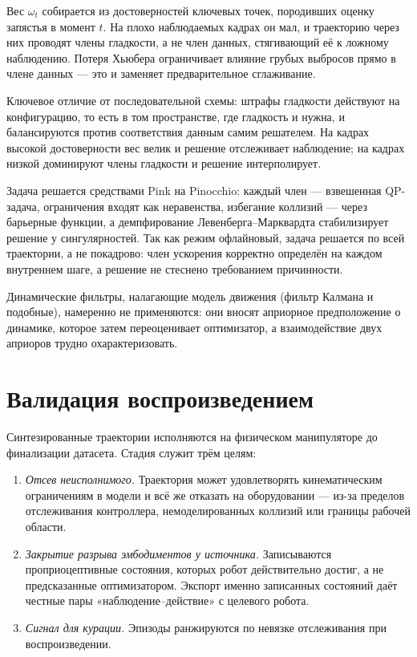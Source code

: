 \documentclass[12pt, a4paper, oneside]{report}
\begin{document}
Вес $\omega_t$ собирается из достоверностей ключевых точек, породивших оценку
запястья в момент $t$. На плохо наблюдаемых кадрах он мал, и траекторию через них
проводят члены гладкости, а не член данных, стягивающий её к ложному наблюдению.
Потеря Хьюбера ограничивает влияние грубых выбросов прямо в члене данных --- это и
заменяет предварительное сглаживание.

Ключевое отличие от последовательной схемы: штрафы гладкости действуют на
конфигурацию, то есть в том пространстве, где гладкость и нужна, и балансируются
против соответствия данным самим решателем. На кадрах высокой достоверности вес
велик и решение отслеживает наблюдение; на кадрах низкой доминируют члены
гладкости и решение интерполирует.

Задача решается средствами Pink на Pinocchio: каждый член --- взвешенная
QP-задача, ограничения входят как неравенства, избегание коллизий --- через
барьерные функции, а демпфирование Левенберга--Марквардта стабилизирует решение у
сингулярностей. Так как режим офлайновый, задача решается по всей траектории, а не
покадрово: член ускорения корректно определён на каждом внутреннем шаге, а решение
не стеснено требованием причинности.

Динамические фильтры, налагающие модель движения (фильтр Калмана и подобные),
намеренно не применяются: они вносят априорное предположение о динамике, которое
затем переоценивает оптимизатор, а взаимодействие двух априоров трудно
охарактеризовать.

\section{Валидация воспроизведением}

Синтезированные траектории исполняются на физическом манипуляторе до финализации
датасета. Стадия служит трём целям:

\begin{enumerate}[leftmargin=2.2em]
  \item \emph{Отсев неисполнимого.} Траектория может удовлетворять кинематическим
        ограничениям в модели и всё же отказать на оборудовании --- из-за пределов
        отслеживания контроллера, немоделированных коллизий или границы рабочей
        области.
  \item \emph{Закрытие разрыва эмбодиментов у источника.} Записываются
        проприоцептивные состояния, которых робот действительно достиг, а не
        предсказанные оптимизатором. Экспорт именно записанных состояний даёт
        честные пары «наблюдение--действие» с целевого робота.
  \item \emph{Сигнал для курации.} Эпизоды ранжируются по невязке отслеживания при
        воспроизведении.
\end{enumerate}
\end{document}
